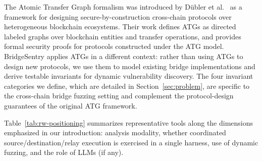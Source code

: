 \documentclass[journal]{IEEEtran}
\begin{document}
The Atomic Transfer Graph formalism was introduced by D\"ubler et al.~\cite{dubler2025atg} as a framework for designing secure-by-construction cross-chain protocols over heterogeneous blockchain ecosystems. Their work defines ATGs as directed labeled graphs over blockchain entities and transfer operations, and provides formal security proofs for protocols constructed under the ATG model. BridgeSentry applies ATGs in a different context: rather than using ATGs to design new protocols, we use them to model existing bridge implementations and derive testable invariants for dynamic vulnerability discovery. The four invariant categories we define, which are detailed in Section~\ref{sec:problem}, are specific to the cross-chain bridge fuzzing setting and complement the protocol-design guarantees of the original ATG framework.

Table~\ref{tab:rw-positioning} summarizes representative tools along the dimensions emphasized in our introduction: analysis modality, whether coordinated source/destination/relay execution is exercised in a single harness, use of dynamic fuzzing, and the role of LLMs (if any).
\end{document}
